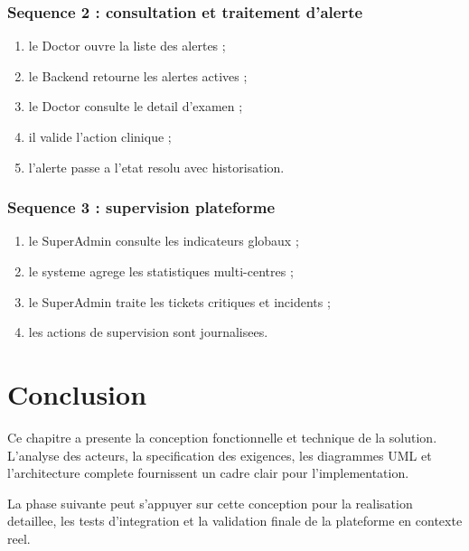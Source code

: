 \subsubsection*{Sequence 2 : consultation et traitement d'alerte}
\begin{enumerate}
    \item le Doctor ouvre la liste des alertes ;
    \item le Backend retourne les alertes actives ;
    \item le Doctor consulte le detail d'examen ;
    \item il valide l'action clinique ;
    \item l'alerte passe a l'etat resolu avec historisation.
\end{enumerate}

\subsubsection*{Sequence 3 : supervision plateforme}
\begin{enumerate}
    \item le SuperAdmin consulte les indicateurs globaux ;
    \item le systeme agrege les statistiques multi-centres ;
    \item le SuperAdmin traite les tickets critiques et incidents ;
    \item les actions de supervision sont journalisees.
\end{enumerate}

\section{Conclusion}
Ce chapitre a presente la conception fonctionnelle et technique de la solution.
L'analyse des acteurs, la specification des exigences, les diagrammes UML et l'architecture complete
fournissent un cadre clair pour l'implementation.

La phase suivante peut s'appuyer sur cette conception pour la realisation detaillee,
les tests d'integration et la validation finale de la plateforme en contexte reel.
